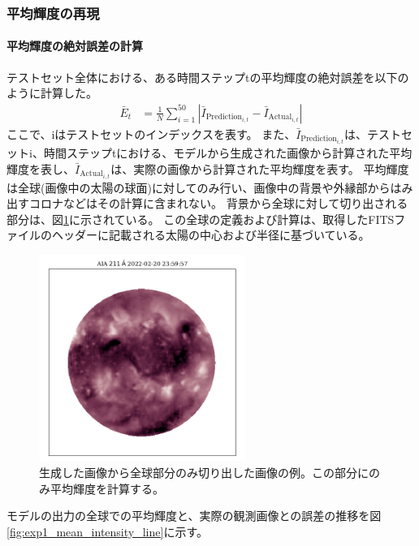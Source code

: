       \subsubsection{平均輝度の再現}
        \paragraph{平均輝度の絶対誤差の計算}
          テストセット全体における、ある時間ステップtの平均輝度の絶対誤差を以下のように計算した。
          \begin{align}
            \bar{E}_{t} & = \frac{1}{N} \sum_{i=1}^{50} | \bar{I}_{\text{Prediction}_{i,t}} - \bar{I}_{\text{Actual}_{i,t}} |
          \end{align}
          ここで、iはテストセットのインデックスを表す。
          また、\( \bar{I}_{\text{Prediction}_{i,t}} \)は、テストセットi、時間ステップtにおける、モデルから生成された画像から計算された平均輝度を表し、\( \bar{I}_{\text{Actual}_{i,t}} \)は、実際の画像から計算された平均輝度を表す。
          平均輝度は全球(画像中の太陽の球面)に対してのみ行い、画像中の背景や外縁部からはみ出すコロナなどはその計算に含まれない。
          背景から全球に対して切り出される部分は、図\ref{fig:exp1_fulldisk_crop}に示されている。
          この全球の定義および計算は、取得したFITSファイルのヘッダーに記載される太陽の中心および半径に基づいている。
          \begin{figure}[htbp]
            \centering
            \includegraphics[width=0.6\textwidth]{figures/exp1/crop_map.png}
            \caption{生成した画像から全球部分のみ切り出した画像の例。この部分にのみ平均輝度を計算する。}
            \label{fig:exp1_fulldisk_crop}
          \end{figure}
          モデルの出力の全球での平均輝度と、実際の観測画像との誤差の推移を図\ref{fig:exp1_mean_intensity_line}に示す。
